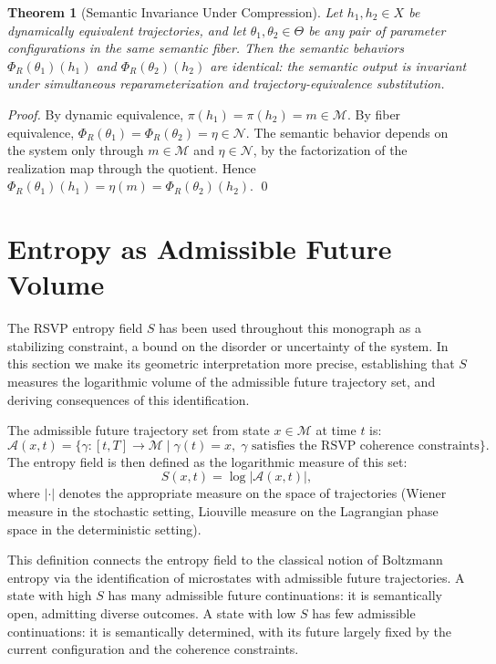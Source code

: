 \documentclass[12pt, a4paper, openany]{book}
\theoremstyle{plain}
\newtheorem{theorem}{Theorem}[chapter]
\theoremstyle{definition}
\theoremstyle{remark}
\newcommand{\Sfield}{S}
\newcommand{\Adm}{\mathcal{A}}
\begin{document}
\begin{theorem}[Semantic Invariance Under Compression]
Let $h_1, h_2 \in X$ be dynamically equivalent trajectories, and let $\theta_1, \theta_2 \in \Theta$ be any pair of parameter configurations in the same semantic fiber. Then the semantic behaviors $\Phi_R(\theta_1)(h_1)$ and $\Phi_R(\theta_2)(h_2)$ are identical: the semantic output is invariant under simultaneous reparameterization and trajectory-equivalence substitution.
\end{theorem}

\begin{proof}
By dynamic equivalence, $\pi(h_1) = \pi(h_2) = m \in \mathcal{M}$. By fiber equivalence, $\Phi_R(\theta_1) = \Phi_R(\theta_2) = \eta \in \mathcal{N}$. The semantic behavior depends on the system only through $m \in \mathcal{M}$ and $\eta \in \mathcal{N}$, by the factorization of the realization map through the quotient. Hence $\Phi_R(\theta_1)(h_1) = \eta(m) = \Phi_R(\theta_2)(h_2)$. \qed
\end{proof}

\section{Entropy as Admissible Future Volume}

The RSVP entropy field $\Sfield$ has been used throughout this monograph as a stabilizing constraint, a bound on the disorder or uncertainty of the system. In this section we make its geometric interpretation more precise, establishing that $\Sfield$ measures the logarithmic volume of the admissible future trajectory set, and deriving consequences of this identification.

The admissible future trajectory set from state $x \in \mathcal{M}$ at time $t$ is:
\[
\Adm(x, t) = \{\gamma: [t, T] \to \mathcal{M} \mid \gamma(t) = x,\; \gamma \text{ satisfies the RSVP coherence constraints}\}.
\]
The entropy field is then defined as the logarithmic measure of this set:
\[
\Sfield(x, t) = \log |\Adm(x, t)|,
\]
where $|\cdot|$ denotes the appropriate measure on the space of trajectories (Wiener measure in the stochastic setting, Liouville measure on the Lagrangian phase space in the deterministic setting).

This definition connects the entropy field to the classical notion of Boltzmann entropy via the identification of microstates with admissible future trajectories. A state with high $\Sfield$ has many admissible future continuations: it is semantically open, admitting diverse outcomes. A state with low $\Sfield$ has few admissible continuations: it is semantically determined, with its future largely fixed by the current configuration and the coherence constraints.
\end{document}
